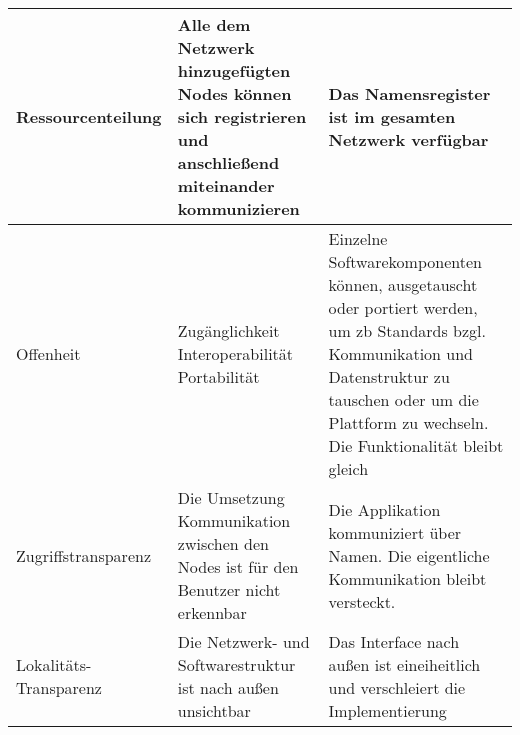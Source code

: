 \begin{longtable}{|>{\raggedright\arraybackslash}p{4cm}|>{\raggedright\arraybackslash}p{5cm}|>{\raggedright\arraybackslash}p{5cm}|}
	Ressourcenteilung  & Alle dem Netzwerk hinzugefügten Nodes können sich registrieren und anschließend miteinander kommunizieren & Das Namensregister ist im gesamten Netzwerk verfügbar\\
	\hline
	Offenheit & 
	\parbox[t]{5cm}{Zugänglichkeit\\Interoperabilität\\Portabilität} 
	& Einzelne Softwarekomponenten können, ausgetauscht oder portiert werden, um zb Standards bzgl. Kommunikation und Datenstruktur zu tauschen oder um die Plattform zu wechseln. Die Funktionalität bleibt gleich\\
	\hline
	Zugriffstransparenz & Die Umsetzung Kommunikation zwischen den Nodes ist für den Benutzer nicht erkennbar & Die Applikation kommuniziert über Namen. Die eigentliche Kommunikation bleibt versteckt.\\
	\hline
	Lokalitäts-Transparenz  & Die Netzwerk- und Softwarestruktur ist nach außen unsichtbar  & Das Interface nach außen ist eineiheitlich und verschleiert die Implementierung\\
	
	
	
	
\end{longtable}
\clearpage

